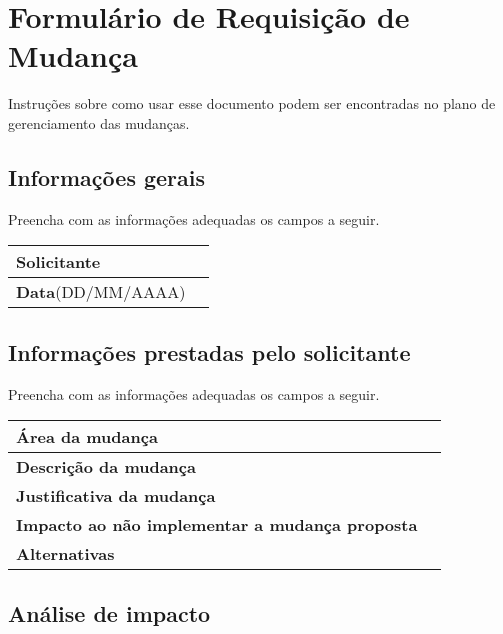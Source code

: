 \chapter{Formulário de Requisição de Mudança}
\label{ch:change-request-form}

Instruções sobre como usar esse documento podem ser encontradas no plano de gerenciamento das mudanças.

\section{Informações gerais}

Preencha com as informações adequadas os campos a seguir.

\begin{table}[H]
	\begin{tabularx}{\textwidth}{| p{} | X |}
		\hline
		\textbf{Solicitante} & \\
		\hline
		\textbf{Data}(DD/MM/AAAA) & \\
		\hline
	\end{tabularx}
	\centering
\end{table}

\section{Informações prestadas pelo solicitante}

Preencha com as informações adequadas os campos a seguir.

\begin{table}[H]
	\begin{tabularx}{\textwidth}{| p{} | X |}
		\hline
		\textbf{Área da mudança} & \\
		\hline
		\textbf{Descrição da mudança} & \\
		\hline
        \textbf{Justificativa da mudança} & \\
		\hline
        \textbf{Impacto ao não implementar a mudança proposta} & \\
		\hline
        \textbf{Alternativas} & \\
		\hline
	\end{tabularx}
	\centering
\end{table}

\section{Análise de impacto}

